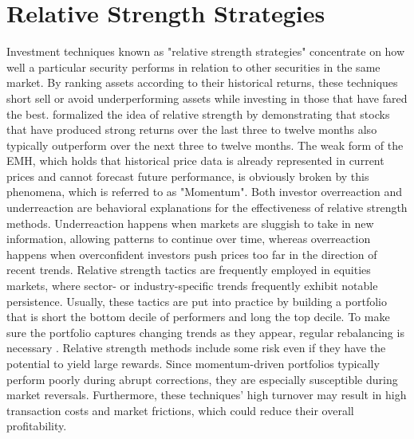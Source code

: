 \documentclass[11pt,a4paper,english,oneside]{book}
\begin{document}
\section{Relative Strength Strategies}
Investment techniques known as "relative strength strategies" concentrate on how well a particular security performs in relation to other securities in the same market. By ranking assets according to their historical returns, these techniques short sell or avoid underperforming assets while investing in those that have fared the best.
\cite{jegadeesh1993returns} formalized the idea of relative strength by demonstrating that stocks that have produced strong returns over the last three to twelve months also typically outperform over the next three to twelve months. The weak form of the EMH, which holds that historical price data is already represented in current prices and cannot forecast future performance, is obviously broken by this phenomena, which is referred to as "Momentum".
Both investor overreaction and underreaction are behavioral explanations for the effectiveness of relative strength methods. Underreaction happens when markets are sluggish to take in new information, allowing patterns to continue over time, whereas overreaction happens when overconfident investors push prices too far in the direction of recent trends.
Relative strength tactics are frequently employed in equities markets, where sector- or industry-specific trends frequently exhibit notable persistence. Usually, these tactics are put into practice by building a portfolio that is short the bottom decile of performers and long the top decile. To make sure the portfolio captures changing trends as they appear, regular rebalancing is necessary \parencite{grinblatt1989mutual}.
Relative strength methods include some risk even if they have the potential to yield large rewards. Since momentum-driven portfolios typically perform poorly during abrupt corrections, they are especially susceptible during market reversals. Furthermore, these techniques' high turnover may result in high transaction costs and market frictions, which could reduce their overall profitability.
\end{document}
